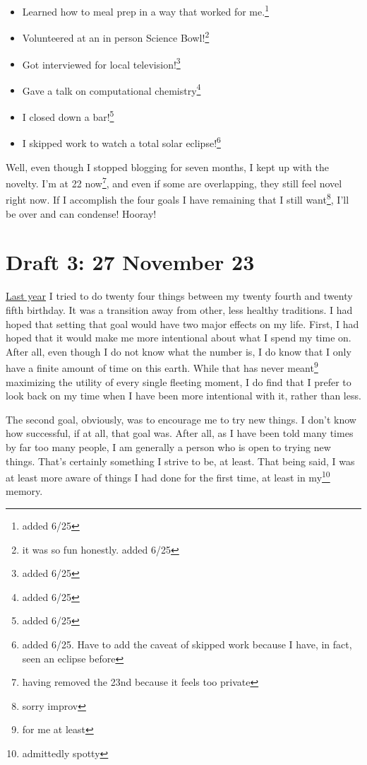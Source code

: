 \documentclass[12pt]{article}[titlepage]
\newcommand{\1}{\={a}}
\newcommand{\2}{\={e}}
\newcommand{\3}{\={\i}}
\newcommand{\4}{\=o}
\newcommand{\5}{\=u}
\newcommand{\6}{\={A}}
\renewcommand{\,}{\textsuperscript{,}}
\begin{document}
\begin{itemize}
\item Learned how to meal prep in a way that worked for me.\footnote{added 6/25}
\item Volunteered at an in person Science Bowl!\footnote{it was so fun honestly. added 6/25}
\item Got interviewed for local television!\footnote{added 6/25}
\item Gave a talk on computational chemistry\footnote{added 6/25}
\item I closed down a bar!\footnote{added 6/25}
\item I skipped work to watch a total solar eclipse!\footnote{added 6/25. Have to add the caveat of skipped work because I have, in fact, seen an eclipse before}
\end{itemize}

Well, even though I stopped blogging for seven months, I kept up with the novelty. I'm at 22 now\footnote{having removed the 23nd because it feels too private}, and even if some are overlapping, they still feel novel right now.
If I accomplish the four goals I have remaining that I still want\footnote{sorry improv}, I'll be over and can condense! 
Hooray!


\section{Draft 3: 27 November 23}
\href{twenty-four.html}{Last year} I tried to do twenty four things between my twenty fourth and twenty fifth birthday.
It was a transition away from other, less healthy traditions.
I had hoped that setting that goal would have two major effects on my life.
First, I had hoped that it would make me more intentional about what I spend my time on.
After all, even though I do not know what the number is, I do know that I only have a finite amount of time on this earth.
While that has never meant\footnote{for me at least} maximizing the utility of every single fleeting moment, I do find that I prefer to look back on my time when I have been more intentional with it, rather than less.

The second goal, obviously, was to encourage me to try new things.
I don't know how successful, if at all, that goal was.
After all, as I have been told many times by far too many people, I am generally a person who is open to trying new things.
That's certainly something I strive to be, at least.
That being said, I was at least more aware of things I had done for the first time, at least in my\footnote{admittedly spotty} memory.
\end{document}
